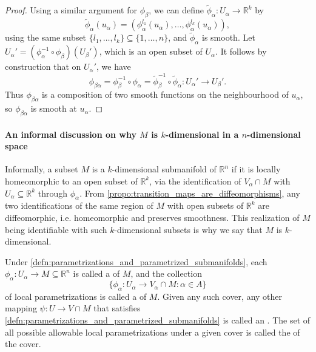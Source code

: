 \documentclass[notoc,notitlepage]{tufte-book}
\begin{document}
\begin{proof}
  Using a similar argument for $\phi_\beta$, we can define
  $\tilde{\phi}_{\alpha} : U_\alpha \to \mathbb{R}^k$ by
  \begin{equation*}
    \tilde{\phi}_{\alpha} (u_\alpha) = (\phi_\alpha^{l_1}(u_\alpha), \ldots,
    \phi_\alpha^{l_k}(u_\alpha)),
  \end{equation*}
  using the same subset $\{ l_1, \ldots, l_k \} \subseteq \{ 1, \ldots, n \}$,
  and $\tilde{\phi}_{\alpha}$ is smooth. Let $U_\alpha' = (\phi_\alpha^{-1}
  \circ \phi_\beta)(U_\beta')$, which is an open subset of $U_\alpha$. It
  follows by construction that on $U_\alpha'$, we have
  \begin{equation*}
    \phi_{\beta \alpha} = \phi_{\beta}^{-1} \circ \phi_{\alpha} =
      \tilde{\phi}_{\beta}^{-1} \circ \tilde{\phi}_{\alpha} : U_\alpha' \to
      U_\beta'. 
  \end{equation*}
  Thus $\phi_{\beta \alpha}$ is a composition of two smooth functions on the
  neighbourhood of $u_\alpha$, so $\phi_{\beta \alpha}$ is smooth at $u_\alpha$.
\end{proof}

\paragraph{An informal discussion on why $M$ is $k$-dimensional in a
$n$-dimensional space} Informally, a subset $M$ is a $k$-dimensional submanifold
of $\mathbb{R}^n$ if it is locally homeomorphic to an open subset of
$\mathbb{R}^k$, via the identification of $V_\alpha \cap M$ with $U_\alpha
\subseteq \mathbb{R}^k$ through $\phi_\alpha$. From
\cref{propo:transition_maps_are_diffeomorphisms}, any two identifications of the
same region of $M$ with open subsets of $\mathbb{R}^k$ are diffeomorphic, i.e.
homeomorphic and preserves smoothness. This realization of $M$ being
identifiable with such $k$-dimensional subsets is why we say that $M$ is
$k$-dimensional.

\begin{defn}\label{defn:local_parametrizations}
  Under \cref{defn:parametrizations_and_parametrized_submanifolds}, each
  $\phi_{\alpha} : U_\alpha \to M \subseteq \mathbb{R}^n$ is called a
   of $M$, and the collection
  \begin{equation*}
    \{ \phi_\alpha : U_\alpha \to V_\alpha \cap M : \alpha \in A \}
  \end{equation*}
  of local parametrizations is called a  of $M$. Given any such
  cover, any other mapping $\psi : U \to V \cap M$ that satisfies
  \cref{defn:parametrizations_and_parametrized_submanifolds} is called an
  . The set of all possible allowable
  local parametrizations under a given cover is called the  of the cover.
\end{defn}
\end{document}
